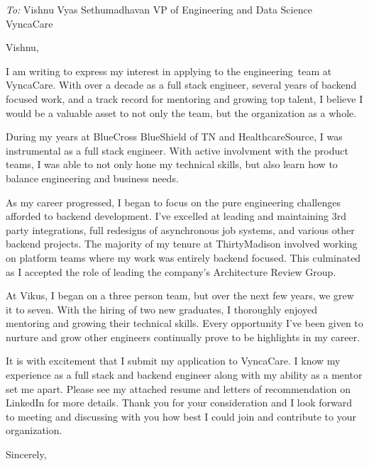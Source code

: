 
\usepackage{parskip}

\newcommand{\applyteam}{engineering}
\newcommand{\applycompany}{VyncaCare}
\newcommand{\applyrole}{Staff Software Engineer}





\textit{To:}\newline
Vishnu Vyas Sethumadhavan\newline
VP of Engineering and Data Science\newline
\applycompany\
\hfill \break
\hfill \break

Vishnu,

I am writing to express my interest in applying to the \applyteam\ team at \applycompany.
With over a decade as a full stack engineer, several years of backend focused work, and a track record for
mentoring and growing top talent, I believe I would be a valuable asset to not only the team, but the
organization as a whole.

During my years at BlueCross BlueShield of TN and HealthcareSource, I was instrumental as a full stack
engineer. With active involvment with the product teams, I was able to not only hone my technical skills,
but also learn how to balance engineering and business needs.

As my career progressed, I began to focus on the pure engineering challenges afforded to backend development.
I've excelled at leading and maintaining 3rd party integrations, full redesigns of asynchronous job systems,
and various other backend projects. The majority of my tenure at ThirtyMadison involved working on platform
teams where my work was entirely backend focused. This culminated as I accepted the role of leading the
company's Architecture Review Group.

At Vikus, I began on a three person team, but over the next few years, we grew it to seven. With the hiring 
of two new graduates, I thoroughly enjoyed mentoring and growing their technical skills. Every opportunity
I've been given to nurture and grow other engineers continually prove to be highlights in my career.

It is with excitement that I submit my application to \applycompany. I know my experience as a
full stack and backend engineer along with my ability as a mentor set me apart. Please see my attached resume and
letters of recommendation on LinkedIn for more details. Thank you for your consideration and I look forward
to meeting and discussing with you how best I could join and contribute to your organization.

\hfill \break
Sincerely,\\
\name

